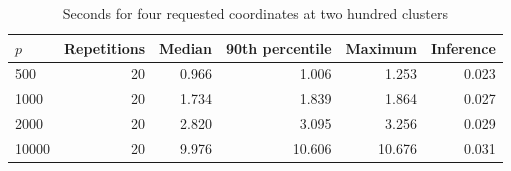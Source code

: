 \begin{table}[t]
\caption{Seconds for four requested coordinates at two hundred clusters}\label{tab:joint-runtime}
\centering\small
\begin{tabular}{lrrrrr}
\toprule
$p$ & Repetitions & Median & 90th percentile & Maximum & Inference \\
\midrule
  500 & 20 & 0.966 & 1.006 & 1.253 & 0.023 \\
 1000 & 20 & 1.734 & 1.839 & 1.864 & 0.027 \\
 2000 & 20 & 2.820 & 3.095 & 3.256 & 0.029 \\
10000 & 20 & 9.976 & 10.606 & 10.676 & 0.031 \\
\bottomrule
\end{tabular}
\end{table}
